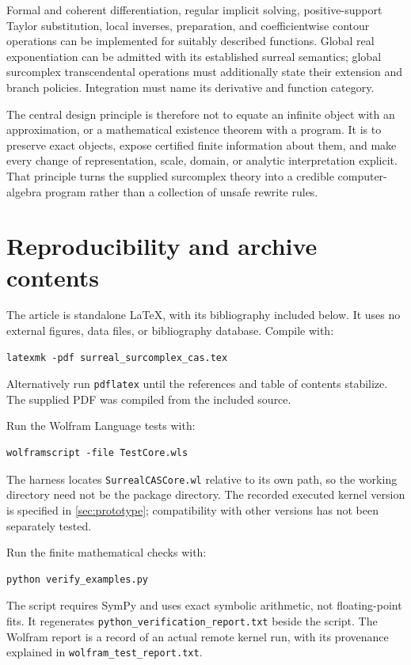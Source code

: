 \documentclass[11pt,letterpaper]{article}
\numberwithin{equation}{section}
\theoremstyle{definition}
\theoremstyle{remark}\newtheorem{remark}[theorem]{Remark}
\begin{document}
Formal and coherent differentiation, regular implicit solving, positive-support
Taylor substitution, local inverses, preparation, and coefficientwise contour
operations can be implemented for suitably described functions. Global real
exponentiation can be admitted with its established surreal semantics;
global surcomplex transcendental operations must additionally state their
extension and branch policies. Integration must name its derivative and
function category.

The central design principle is therefore not to equate an infinite object
with an approximation, or a mathematical existence theorem with a program.
It is to preserve exact objects, expose certified finite information about
them, and make every change of representation, scale, domain, or analytic
interpretation explicit. That principle turns the supplied surcomplex theory
into a credible computer-algebra program rather than a collection of unsafe
rewrite rules.

\appendix
\section{Reproducibility and archive contents}
\label{app:repro}
The article is standalone LaTeX, with its bibliography included below. It uses
no external figures, data files, or bibliography database. Compile with:
\begin{lstlisting}
latexmk -pdf surreal_surcomplex_cas.tex
\end{lstlisting}
Alternatively run \texttt{pdflatex} until the references and table of contents
stabilize. The supplied PDF was compiled from the included source.

Run the Wolfram Language tests with:
\begin{lstlisting}
wolframscript -file TestCore.wls
\end{lstlisting}
The harness locates \texttt{SurrealCASCore.wl} relative to its own path, so the
working directory need not be the package directory. The recorded executed
kernel version is specified in \cref{sec:prototype}; compatibility with other
versions has not been separately tested.

Run the finite mathematical checks with:
\begin{lstlisting}
python verify_examples.py
\end{lstlisting}
The script requires SymPy and uses exact symbolic arithmetic, not floating-point
fits. It regenerates \texttt{python\_verification\_report.txt} beside the script.
The Wolfram report is a record of an actual remote kernel run, with its
provenance explained in \texttt{wolfram\_test\_report.txt}.
\end{document}
